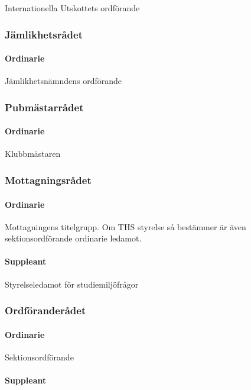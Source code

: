 \documentclass{dgovdoc}
\begin{document}
Internationella Utskottets ordförande

\subsubsection{Jämlikhetsrådet}

\paragraph{Ordinarie}

Jämlikhetsnämndens ordförande

\subsubsection{Pubmästarrådet}

\paragraph{Ordinarie}

Klubbmästaren

\subsubsection{Mottagningsrådet}

\paragraph{Ordinarie}

Mottagningens titelgrupp. Om THS styrelse så bestämmer är även
sektionsordförande ordinarie ledamot.

\paragraph{Suppleant}

Styrelseledamot för studiemiljöfrågor

\subsubsection{Ordföranderådet}

\paragraph{Ordinarie}

Sektionsordförande

\paragraph{Suppleant}
\end{document}

